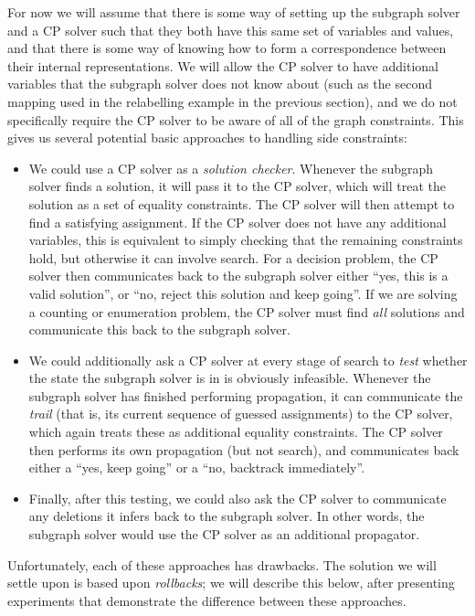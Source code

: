 \documentclass[runningheads]{llncs}
\begin{document}
For now we will assume that there is some way of setting up the subgraph solver and a CP solver such
that they both have this same set of variables and values, and that there is some way of knowing how
to form a correspondence between their internal representations. We will allow the CP solver to have
additional variables that the subgraph solver does not know about (such as the second mapping used
in the relabelling example in the previous section), and we do not specifically require the CP
solver to be aware of all of the graph constraints.  This gives us several potential basic
approaches to handling side constraints:
\begin{itemize}
    \item We could use a CP solver as a \emph{solution checker}. Whenever the subgraph solver finds
        a solution, it will pass it to the CP solver, which will treat the solution as a set of
        equality constraints. The CP solver will then attempt to find a satisfying assignment. If
        the CP solver does not have any additional variables, this is equivalent to simply checking
        that the remaining constraints hold, but otherwise it can involve search. For a decision
        problem, the CP solver then communicates back to the subgraph solver either ``yes, this is a
        valid solution'', or ``no, reject this solution and keep going''. If we
        are solving a counting or enumeration problem, the CP solver must find \emph{all} solutions
        and communicate this back to the subgraph solver.
    \item We could additionally ask a CP solver at every stage of search to \emph{test} whether the
        state the subgraph solver is in is obviously infeasible. Whenever the subgraph solver has
        finished performing propagation, it can communicate the \emph{trail} (that is, its current
        sequence of guessed assignments) to the CP solver, which again treats these as additional
        equality constraints. The CP solver then performs its own propagation (but not search), and
        communicates back either a ``yes, keep going'' or a ``no, backtrack immediately''.
    \item Finally, after this testing, we could also ask the CP solver to communicate any deletions
        it infers back to the subgraph solver. In other words, the subgraph solver would use the CP
        solver as an additional propagator.
\end{itemize}
Unfortunately, each of these approaches has drawbacks. The solution we will settle upon is based
upon \emph{rollbacks}; we will describe this below, after presenting experiments that demonstrate
the difference between these approaches.
\end{document}
